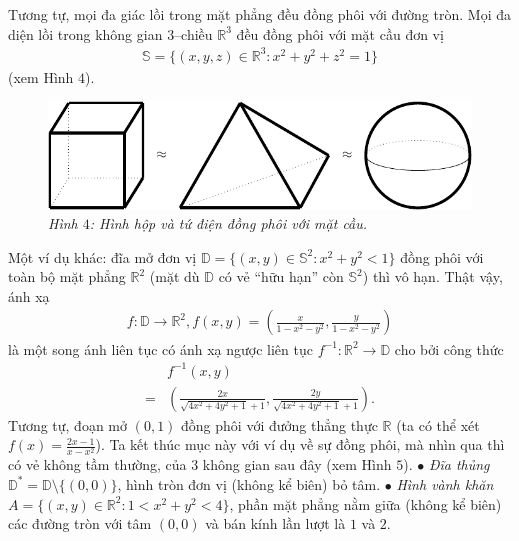 \begin{multicols}{2}
\begin{figure}[H]
		\vspace*{-10pt}
	\end{figure}
	Tương tự, mọi đa giác lồi trong mặt phẳng đều đồng phôi với đường tròn. Mọi đa diện lồi trong không gian $3$--chiều $\mathbb{R}^3$ đều đồng phôi với mặt cầu đơn vị  
	\begin{align*}
		\mathbb{S} = \{(x,y,z) \in \mathbb{R}^3: x^2 + y^2 + z^2 = 1\}
	\end{align*}
	(xem Hình $4$).
	\begin{figure}[H]
		\vspace*{-5pt}
		\centering\captionsetup{labelformat=empty, justification=centering}
		\includegraphics[width=1\linewidth]{H4.pdf}
		\caption{\small\textit{\color{duongvaotoanhoc}Hình $4$: Hình hộp và tứ điện đồng phôi với mặt cầu.}}
		\vspace*{-10pt}
	\end{figure}
	Một ví dụ khác: đĩa mở đơn vị $\mathbb{D} = \{(x,y) \in \mathbb{S}^2: x^2 + y^2 < 1\}$ đồng phôi với toàn bộ mặt phẳng $\mathbb{R}^2$ (mặt dù $\mathbb{D}$ có vẻ ``hữu hạn'' còn $\mathbb{S}^2$) thì vô hạn. Thật vậy, ánh xạ
	\begin{align*}
		f\!:\! \mathbb{D} \!\to\! \mathbb{R}^2,  f(x,y) \!=\! \left(\!\!\frac{x}{1 \!-\! x^2 \!-\! y^2}, \frac{y}{1 \!-\! x^2 \!-\! y^2}\!\right)
	\end{align*}
	là một song ánh liên tục có ánh xạ ngược liên tục $f^{-1}: \mathbb{R}^2 \to \mathbb{D}$ cho bởi công thức
	\begin{align*}
		&f^{-1}(x,y) \\
		= &\left(\!\frac{2x}{\sqrt{4x^2 \!+\! 4y^2 \!+\! 1} \!+\! 1}, \frac{2y}{\sqrt{4x^2 \!+\! 4y^2 \!+\! 1} \!+\! 1}\!\right).
	\end{align*}
	Tương tự, đoạn mở $(0,1)$ đồng phôi với đưởng thẳng thực $\mathbb{R}$ (ta có thể xét $f(x) = \frac{2x-1}{x - x^2}$).
	\vskip 0.1cm
	Ta kết thúc mục này với ví dụ về sự đồng phôi, mà nhìn qua thì có vẻ không tầm thường, của $3$ không gian sau đây (xem Hình $5$).
	\vskip 0.1cm
	$\bullet$ {\it Đĩa thủng} $\mathbb{D}^\ast = \mathbb{D} \setminus \{(0,0)\}$, hình tròn đơn vị (không kể biên) bỏ tâm.
	\vskip 0.1cm
	$\bullet$ {\it Hình vành khăn} $A = \{(x,y) \in \mathbb{R}^2: 1 < x^2 + y^2 < 4\}$, phần mặt phẳng nằm giữa (không kể biên) các đường tròn với tâm $(0,0)$ và bán kính lần lượt là $1$ và $2$.

\end{multicols}
